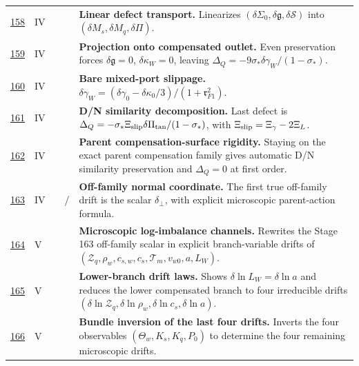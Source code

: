 {\begin{longtable}{@{}L{0.055\textwidth}L{0.075\textwidth}L{0.145\textwidth}L{0.235\textwidth}L{0.43\textwidth}@{}}
\addlinespace
\hyperref[stage:158]{158} & IV &  & \StatusExactClosure{} & \textbf{Linear defect transport.} Linearizes \((\delta\Sigma_0,\delta\mathfrak g,\delta\mathcal S)\) into \((\delta M_s,\delta M_q,\delta\Pi)\). \\
\addlinespace
\hyperref[stage:159]{159} & IV &  & \StatusExactClosure{} & \textbf{Projection onto compensated outlet.} Even preservation forces \(\delta\mathfrak g=0\), \(\delta\kappa_W=0\), leaving \(\Delta_Q=-9\sigma_*\delta\gamma_W/(1-\sigma_*)\). \\
\addlinespace
\hyperref[stage:160]{160} & IV &  & \StatusExactClosure{} & \textbf{Bare mixed-port slippage.} \(\delta\gamma_W=(\delta\gamma_0-\delta\kappa_0/3)/(1+\mathfrak r_{F1}^2)\). \\
\addlinespace
\hyperref[stage:161]{161} & IV &  & \StatusExactClosure{} & \textbf{D/N similarity decomposition.} Last defect is \(\Delta_Q=-\sigma_*\Xi_{\rm slip}\delta\Pi_{\rm tan}/(1-\sigma_*)\), with \(\Xi_{\rm slip}=\Xi_\gamma-2\Xi_L\). \\
\addlinespace
\hyperref[stage:162]{162} & IV &  & \StatusExactClosure{} & \textbf{Parent compensation-surface rigidity.} Staying on the exact parent compensation family gives automatic D/N similarity preservation and \(\Delta_Q=0\) at first order. \\
\addlinespace
\hyperref[stage:163]{163} & IV &  & \StatusExactClosure{} / \StatusOpen{} & \textbf{Off-family normal coordinate.} The first true off-family drift is the scalar \(\delta_\perp\), with explicit microscopic parent-action formula. \\
\addlinespace
\hyperref[stage:164]{164} & V &  & \StatusExactClosure{} & \textbf{Microscopic log-imbalance channels.} Rewrites the Stage 163 off-family scalar in explicit branch-variable drifts of \((\mathcal Z_q,\rho_w,c_{s,w},c_s,\mathcal T_m,v_{w0},a,L_W)\). \\
\addlinespace
\hyperref[stage:165]{165} & V &  & \StatusExactClosure{} & \textbf{Lower-branch drift laws.} Shows \(\delta\ln L_W=\delta\ln a\) and reduces the lower compensated branch to four irreducible drifts \((\delta\ln\mathcal Z_q,\delta\ln\rho_w,\delta\ln c_s,\delta\ln a)\). \\
\addlinespace
\hyperref[stage:166]{166} & V &  & \StatusExactClosure{} & \textbf{Bundle inversion of the last four drifts.} Inverts the four observables \((\Theta_w,K_s,K_q,P_0)\) to determine the four remaining microscopic drifts. \\

\end{longtable}}
